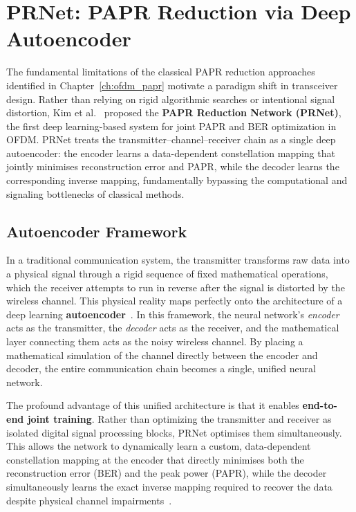 \chapter{PRNet: PAPR Reduction via Deep Autoencoder}
\label{ch:prnet}

The fundamental limitations of the classical PAPR reduction approaches identified in Chapter~\ref{ch:ofdm_papr} motivate a paradigm shift in transceiver design. Rather than relying on rigid algorithmic searches or intentional signal distortion, Kim et al.~\cite{kim2017novel} proposed the \textbf{PAPR Reduction Network (PRNet)}, the first deep learning-based system for joint PAPR and BER optimization in OFDM. PRNet treats the transmitter--channel--receiver chain as a single deep autoencoder: the encoder learns a data-dependent constellation mapping that jointly minimises reconstruction error and PAPR, while the decoder learns the corresponding inverse mapping, fundamentally bypassing the computational and signaling bottlenecks of classical methods.

\section{Autoencoder Framework}
\label{sec:autoencoder_framework}

In a traditional communication system, the transmitter transforms raw data into a physical signal through a rigid sequence of fixed mathematical operations, which the receiver attempts to run in reverse after the signal is distorted by the wireless channel. This physical reality maps perfectly onto the architecture of a deep learning \textbf{autoencoder}~\cite{kim2017novel}. In this framework, the neural network's \emph{encoder} acts as the transmitter, the \emph{decoder} acts as the receiver, and the mathematical layer connecting them acts as the noisy wireless channel. By placing a mathematical simulation of the channel directly between the encoder and decoder, the entire communication chain becomes a single, unified neural network.

The profound advantage of this unified architecture is that it enables \textbf{end-to-end joint training}. Rather than optimizing the transmitter and receiver as isolated digital signal processing blocks, PRNet optimises them simultaneously. This allows the network to dynamically learn a custom, data-dependent constellation mapping at the encoder that directly minimises both the reconstruction error (BER) and the peak power (PAPR), while the decoder simultaneously learns the exact inverse mapping required to recover the data despite physical channel impairments~\cite{kim2017novel}.

